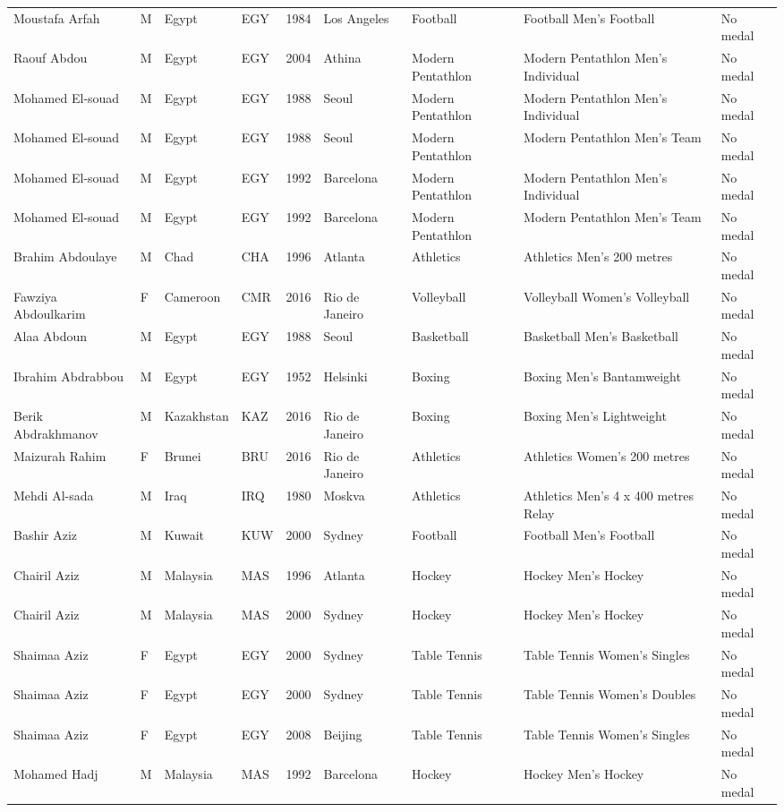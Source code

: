 \documentclass{article}%
\begin{document}
\begin{longtable}{l l l l l l l l l}
Moustafa Arfah&M&Egypt&EGY&1984&Los Angeles&Football&Football Men's Football&No medal\\%
Raouf Abdou&M&Egypt&EGY&2004&Athina&Modern Pentathlon&Modern Pentathlon Men's Individual&No medal\\%
Mohamed El{-}souad&M&Egypt&EGY&1988&Seoul&Modern Pentathlon&Modern Pentathlon Men's Individual&No medal\\%
Mohamed El{-}souad&M&Egypt&EGY&1988&Seoul&Modern Pentathlon&Modern Pentathlon Men's Team&No medal\\%
Mohamed El{-}souad&M&Egypt&EGY&1992&Barcelona&Modern Pentathlon&Modern Pentathlon Men's Individual&No medal\\%
Mohamed El{-}souad&M&Egypt&EGY&1992&Barcelona&Modern Pentathlon&Modern Pentathlon Men's Team&No medal\\%
Brahim Abdoulaye&M&Chad&CHA&1996&Atlanta&Athletics&Athletics Men's 200 metres&No medal\\%
Fawziya Abdoulkarim&F&Cameroon&CMR&2016&Rio de Janeiro&Volleyball&Volleyball Women's Volleyball&No medal\\%
Alaa Abdoun&M&Egypt&EGY&1988&Seoul&Basketball&Basketball Men's Basketball&No medal\\%
Ibrahim Abdrabbou&M&Egypt&EGY&1952&Helsinki&Boxing&Boxing Men's Bantamweight&No medal\\%
Berik Abdrakhmanov&M&Kazakhstan&KAZ&2016&Rio de Janeiro&Boxing&Boxing Men's Lightweight&No medal\\%
Maizurah Rahim&F&Brunei&BRU&2016&Rio de Janeiro&Athletics&Athletics Women's 200 metres&No medal\\%
Mehdi Al{-}sada&M&Iraq&IRQ&1980&Moskva&Athletics&Athletics Men's 4 x 400 metres Relay&No medal\\%
Bashir Aziz&M&Kuwait&KUW&2000&Sydney&Football&Football Men's Football&No medal\\%
Chairil Aziz&M&Malaysia&MAS&1996&Atlanta&Hockey&Hockey Men's Hockey&No medal\\%
Chairil Aziz&M&Malaysia&MAS&2000&Sydney&Hockey&Hockey Men's Hockey&No medal\\%
Shaimaa Aziz&F&Egypt&EGY&2000&Sydney&Table Tennis&Table Tennis Women's Singles&No medal\\%
Shaimaa Aziz&F&Egypt&EGY&2000&Sydney&Table Tennis&Table Tennis Women's Doubles&No medal\\%
Shaimaa Aziz&F&Egypt&EGY&2008&Beijing&Table Tennis&Table Tennis Women's Singles&No medal\\%
Mohamed Hadj&M&Malaysia&MAS&1992&Barcelona&Hockey&Hockey Men's Hockey&No medal\\%

\end{longtable}
\end{document}
